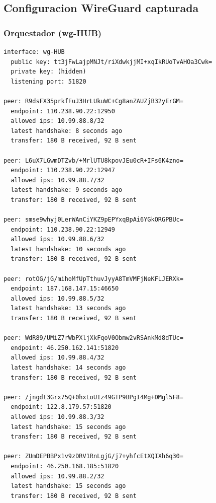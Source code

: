 \documentclass[11pt,a4paper]{article}
\begin{document}
\subsection{Configuracion WireGuard capturada}
\subsubsection*{Orquestador (wg-HUB)}
\begin{lstlisting}
interface: wg-HUB
  public key: tt3jFwLajpMNJt/riXdwkjjMI+xqIkRUoTvAHOa3Cwk=
  private key: (hidden)
  listening port: 51820

peer: R9dsFX35prkfFuJ3HrLUkuWC+Cg8anZAUZjB32yErGM=
  endpoint: 110.238.90.22:12950
  allowed ips: 10.99.88.8/32
  latest handshake: 8 seconds ago
  transfer: 180 B received, 92 B sent

peer: L6uX7LGwmDTZvb/+MrlUTU8kpovJEu0cR+IFs6K4zno=
  endpoint: 110.238.90.22:12947
  allowed ips: 10.99.88.7/32
  latest handshake: 9 seconds ago
  transfer: 180 B received, 92 B sent

peer: smse9whyj0LerWAnCiYKZ9pEPYxqBpAi6YGkORGPBUc=
  endpoint: 110.238.90.22:12949
  allowed ips: 10.99.88.6/32
  latest handshake: 10 seconds ago
  transfer: 180 B received, 92 B sent

peer: rotOG/jG/mihoMfUpTthuvJyyA8TmVMFjNeKFLJERXk=
  endpoint: 187.168.147.15:46650
  allowed ips: 10.99.88.5/32
  latest handshake: 13 seconds ago
  transfer: 180 B received, 92 B sent

peer: WdR89/UMiZ7rWbPXljXkFqoV0Obmw2vRSAnkMd8dTUc=
  endpoint: 46.250.162.141:51820
  allowed ips: 10.99.88.4/32
  latest handshake: 14 seconds ago
  transfer: 180 B received, 92 B sent

peer: /jngdt3Grx75Q+0hxLoUIz49GTP9BPgI4Mg+DMgl5F8=
  endpoint: 122.8.179.57:51820
  allowed ips: 10.99.88.3/32
  latest handshake: 15 seconds ago
  transfer: 180 B received, 92 B sent

peer: ZUmDEPBBPx1v9zDRV1RnLgjG/j7+yhfcEtXQIXh6q30=
  endpoint: 46.250.168.185:51820
  allowed ips: 10.99.88.2/32
  latest handshake: 15 seconds ago
  transfer: 180 B received, 92 B sent

\end{lstlisting}
\end{document}
